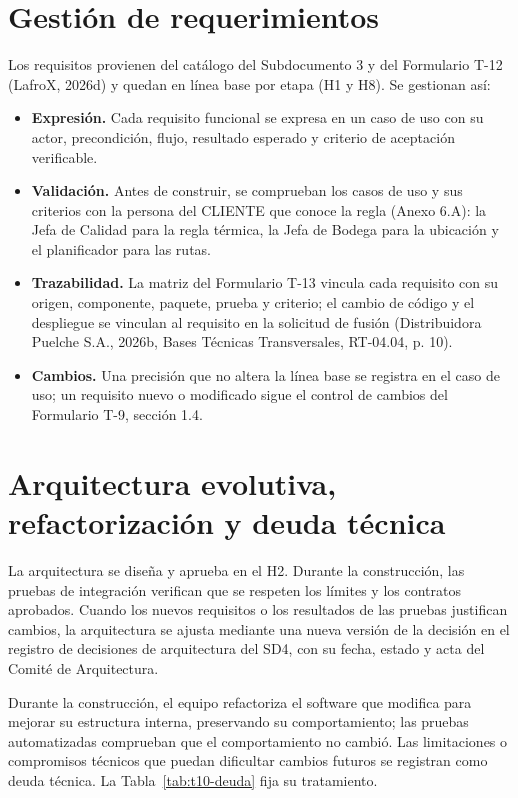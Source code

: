 \documentclass[carta,firma,final]{lafrox}
\begin{document}
\section{Gestión de requerimientos}

Los requisitos provienen del catálogo del Subdocumento 3 y del Formulario T-12 (LafroX, 2026d) y quedan en línea base por etapa (H1 y H8). Se gestionan así:
\begin{itemize}
  \item \textbf{Expresión.} Cada requisito funcional se expresa en un caso de uso con su actor, precondición, flujo, resultado esperado y criterio de aceptación verificable.
  \item \textbf{Validación.} Antes de construir, se comprueban los casos de uso y sus criterios con la persona del CLIENTE que conoce la regla (Anexo 6.A): la Jefa de Calidad para la regla térmica, la Jefa de Bodega para la ubicación y el planificador para las rutas.
  \item \textbf{Trazabilidad.} La matriz del Formulario T-13 vincula cada requisito con su origen, componente, paquete, prueba y criterio; el cambio de código y el despliegue se vinculan al requisito en la solicitud de fusión (Distribuidora Puelche S.A., 2026b, Bases Técnicas Transversales, RT-04.04, p. 10).
  \item \textbf{Cambios.} Una precisión que no altera la línea base se registra en el caso de uso; un requisito nuevo o modificado sigue el control de cambios del Formulario T-9, sección 1.4.
\end{itemize}

\section{Arquitectura evolutiva, refactorización y deuda técnica}

La arquitectura se diseña y aprueba en el H2. Durante la construcción, las pruebas de integración verifican que se respeten los límites y los contratos aprobados. Cuando los nuevos requisitos o los resultados de las pruebas justifican cambios, la arquitectura se ajusta mediante una nueva versión de la decisión en el registro de decisiones de arquitectura del SD4, con su fecha, estado y acta del Comité de Arquitectura.

Durante la construcción, el equipo refactoriza el software que modifica para mejorar su estructura interna, preservando su comportamiento; las pruebas automatizadas comprueban que el comportamiento no cambió. Las limitaciones o compromisos técnicos que puedan dificultar cambios futuros se registran como deuda técnica. La Tabla~\ref{tab:t10-deuda} fija su tratamiento.
\end{document}
